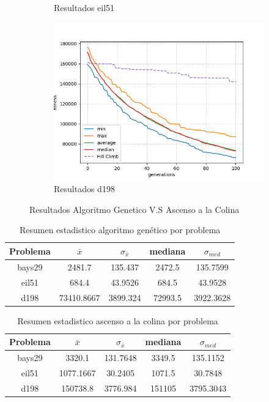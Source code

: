 \documentclass[twocolumn]{IEEEtran}
\begin{document}
\begin{figure}
\begin{subfigure}[b]{1\linewidth}
        \caption{Resultados eil51}
    \end{subfigure}
    \begin{subfigure}[b]{1\linewidth}
        \includegraphics[width=\linewidth]{figures/tspd198.png}
        \caption{Resultados d198}
    \end{subfigure}
    \caption{Resultados Algoritmo Genetico V.S Ascenso a la Colina}
\end{figure}

\begin{table}[htpb]
\centering
\begin{tabular}{|c|c|c|c|c|}
    \hline
    Problema & $\bar{x}$ & $\sigma_{\bar{x}}$ & mediana & $\sigma_{med}$ \\
    \hline
    bays29 & 2481.7 & 135.437 & 2472.5 & 135.7599 \\
    \hline
    eil51 & 684.4 & 43.9526 & 684.5 & 43.9528 \\
    \hline
    d198 & 73410.8667 & 3899.324 & 72993.5 & 3922.3628 \\
    \hline
\end{tabular}
\caption{Resumen estadistico algoritmo genético por problema}
\label{table:results_ga}
\end{table}

\begin{table}[htpb]
    \centering
    \begin{tabular}{|c|c|c|c|c|}
        \hline
        Problema & $\bar{x}$ & $\sigma_{\bar{x}}$ & mediana & $\sigma_{med}$ \\
        \hline
        bays29 & 3320.1 & 131.7648 & 3349.5 & 135.1152 \\
        \hline
        eil51 & 1077.1667 & 30.2405 & 1071.5 & 30.7848 \\
        \hline
        d198 & 150738.8 & 3776.984 & 151105 & 3795.3043 \\
        \hline
    \end{tabular}
    \caption{Resumen estadistico ascenso a la colina por problema}
    \label{table:results_hc}
    \end{table}
\end{document}
